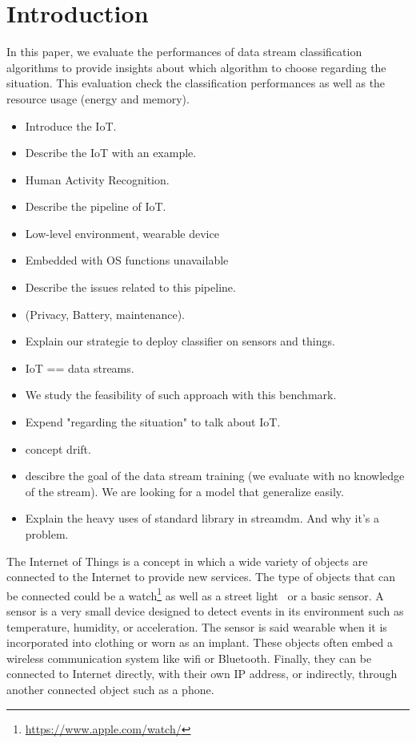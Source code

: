 \section{Introduction}
\label{sec:introduction}

In this paper, we evaluate the performances of
data stream classification algorithms to provide
insights about which algorithm to choose regarding
the situation.
This evaluation check the classification
performances as well as the resource usage (energy
and memory).

\begin{itemize}
		\item Introduce the IoT.
		\item Describe the IoT with an example.
		\item Human Activity Recognition.
		\item Describe the pipeline of IoT.
		\item Low-level environment, wearable device
		\item Embedded with OS functions unavailable
		\item Describe the issues related to this
				pipeline.
		\item (Privacy, Battery, maintenance).
		\item Explain our strategie to deploy
				classifier on sensors and things.
		\item IoT == data streams.
		\item We study the feasibility of such
				approach with this benchmark.
		\item Expend "regarding the situation" to talk about IoT.
		\item concept drift.
		\item descibre the goal of the data stream
				training (we evaluate with no knowledge of
				the stream). We are looking for a model
				that generalize easily.
		\item Explain the heavy uses of standard
				library in streamdm. And why it's a
				problem.
\end{itemize}
The Internet of
Things is a concept in which a wide variety
of objects are connected to the Internet to
provide new services.  The
type of objects that can be connected could be a
watch\footnote{\url{https://www.apple.com/watch/}}
as well as a street light~\cite{smart-lamp-2011}
or a basic sensor. A sensor is a very small device
designed to detect events in its environment such
as temperature, humidity, or acceleration.  The
sensor is said wearable when it is incorporated
into clothing or worn as an implant. These objects often
embed a wireless communication system like wifi
or Bluetooth.  Finally, they can be
connected to Internet directly, with their own IP
address, or indirectly, through another connected
object such as a phone.

